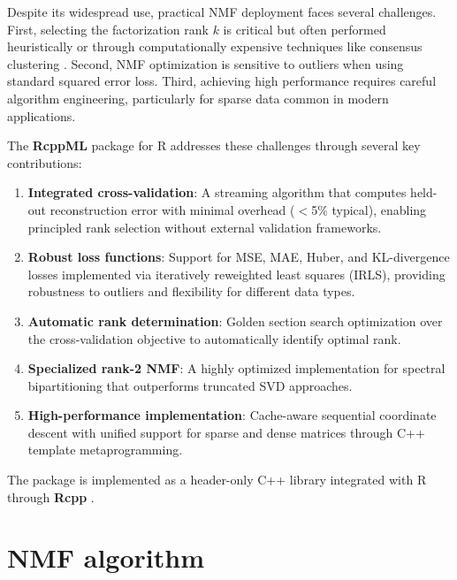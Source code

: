 \documentclass[11pt]{article}
\newcommand{\proglang}[1]{\textsf{#1}}
\newcommand{\pkg}[1]{\textbf{#1}}
\begin{document}
Despite its widespread use, practical NMF deployment faces several challenges. 
First, selecting the factorization rank $k$ is critical but often performed 
heuristically or through computationally expensive techniques like consensus 
clustering \citep{Brunet2004}. Second, NMF optimization is sensitive to outliers 
when using standard squared error loss. Third, achieving high performance 
requires careful algorithm engineering, particularly for sparse data common in 
modern applications.

The \pkg{RcppML} package for \proglang{R} addresses these challenges through 
several key contributions:

\begin{enumerate}
  \item \textbf{Integrated cross-validation}: A streaming algorithm that 
  computes held-out reconstruction error with minimal overhead ($<$5\% typical), 
  enabling principled rank selection without external validation frameworks.
  
  \item \textbf{Robust loss functions}: Support for MSE, MAE, Huber, and 
  KL-divergence losses implemented via iteratively reweighted least squares 
  (IRLS), providing robustness to outliers and flexibility for different data 
  types.
  
  \item \textbf{Automatic rank determination}: Golden section search 
  optimization over the cross-validation objective to automatically identify 
  optimal rank.
  
  \item \textbf{Specialized rank-2 NMF}: A highly optimized implementation for 
  spectral bipartitioning that outperforms truncated SVD approaches.
  
  \item \textbf{High-performance implementation}: Cache-aware sequential 
  coordinate descent with unified support for sparse and dense matrices through 
  \proglang{C++} template metaprogramming.
\end{enumerate}

The package is implemented as a header-only \proglang{C++} library integrated 
with \proglang{R} through \pkg{Rcpp} \citep{Eddelbuettel2011, Eddelbuettel2013}. 


\section{NMF algorithm} \label{sec:algorithm}
\end{document}
